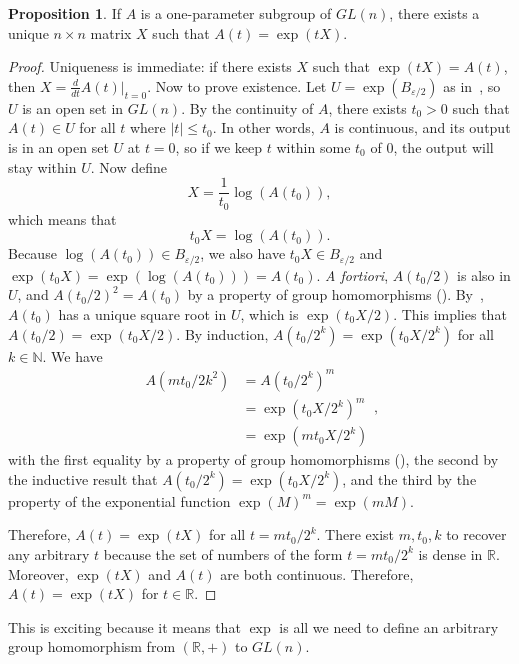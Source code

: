 \documentclass[12pt]{article}
\newcommand{\R}{\mathbb{R}}
\newcommand{\N}{\mathbb{N}}
\theoremstyle{definition}
\newtheorem{prop}[them]{Proposition}
\theoremstyle{definition}
\theoremstyle{definition}
\theoremstyle{definition}
\theoremstyle{definition}
\theoremstyle{definition}
\theoremstyle{definition}
\theoremstyle{definition}
\begin{document}
\begin{prop} 
If $A$ is a one-parameter subgroup of $GL(n)$,
there exists a unique $n \times n$ matrix $X$ such
that $A(t) = \exp(tX)$.
\end{prop}
\begin{proof} 
\par{Uniqueness is immediate: if there exists $X$
such that $\exp(tX) = A(t)$, then $X =
\frac{d}{dt}A(t)\big|_{t=0}$. Now to prove
existence. Let $U = \exp(B_{\varepsilon / 2})$ as
in~, so $U$ is an open set in
$GL(n)$. By the continuity of $A$, there exists
$t_0 > 0$ such that $A(t) \in U$ for all $t$ where
$|t| \leq t_0$. In other words, $A$ is continuous,
and its output is in an open set $U$ at $t=0$, so
if we keep $t$ within some $t_0$ of $0$, the
output will stay within $U$. Now define
\[
    X = \frac{1}{t_0}\log(A(t_0)),
\] 
which means that
\[
    t_0X = \log(A(t_0)).    
\] 
Because $\log(A(t_0)) \in B_{\varepsilon/2}$, we also have 
$t_0X \in B_{\varepsilon/2}$ and $\exp(t_0X) = \exp(\log(
A(t_0))) = A(t_0)$. \textit{A fortiori}, $A(t_0/2)$ is also in $U$, and
${A(t_0/2)}^2 = A(t_0)$ by a property of group
homomorphisms (). By~,
$A(t_0)$ has a unique square root in $U$, which is
$\exp(t_0X/2)$. This implies that $A(t_0/2) =
\exp(t_0X/2)$. By induction, $A(t_0/2^k) =
\exp(t_0X/2^k)$ for all $k \in \N$. We have
\[
\begin{aligned} 
    A(mt_0/2k^2) & = {A(t_0/2^k)}^m \\ 
    & = {\exp(t_0X/2^k)}^m \\ 
    & = \exp(mt_0X/2^k)
\end{aligned},
\] 
with the first equality by a property of group
homomorphisms (), the second by the
inductive result that $A(t_0/2^k) =
\exp(t_0X/2^k)$, and the third by the property of
the exponential function ${\exp(M)}^m =
\exp(mM)$.}

\par{Therefore, $A(t) = \exp(tX)$ for all $t =
mt_0/2^k$. There exist $m, t_0, k$ to recover any
arbitrary $t$ because the set of numbers of the
form $t = mt_0/2^k$ is dense in $\R$. Moreover,
$\exp(tX)$ and $A(t)$ are both continuous.
Therefore, $A(t) = \exp(tX)$ for $t \in \R$.}
\end{proof}

\par{This is exciting because it means that $\exp$ is all we need to define an arbitrary group homomorphism from $(\R, +)$ to $GL(n)$.}
\end{document}
